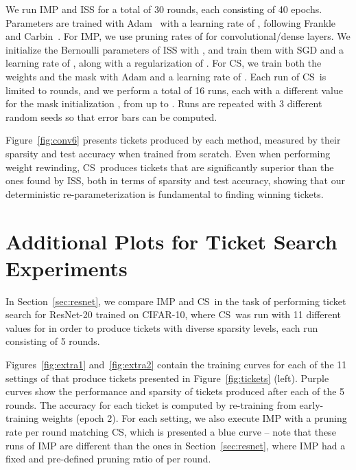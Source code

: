 \documentclass{article}
\newcommand{\citep}[1]{\cite{#1}}
\newcommand{\citet}[1]{\cite{#1}}
\newcommand{\methodacro}{CS}
\begin{document}
We run IMP and ISS for a total of 30 rounds, each consisting of 40 epochs. Parameters are trained with Adam~\citep{adam} with a learning rate of , following Frankle and Carbin~\citet{lth}. For IMP, we use pruning rates of  for convolutional/dense layers. We initialize the Bernoulli parameters of ISS with , and train them with SGD and a learning rate of , along with a  regularization of . For \methodacro, we train both the weights and the mask with Adam and a learning rate of . Each run of \methodacro~is limited to  rounds, and we perform a total of 16 runs, each with a different value for the mask initialization , from  up to . Runs are repeated with 3 different random seeds so that error bars can be computed.

Figure~\ref{fig:conv6} presents tickets produced by each method, measured by their sparsity and test accuracy when trained from scratch. Even when performing weight rewinding, \methodacro~produces tickets that are significantly superior than the ones found by ISS, both in terms of sparsity and test accuracy, showing that our deterministic re-parameterization is fundamental to finding winning tickets.

\section{Additional Plots for Ticket Search Experiments}
\label{app:additional}

In Section~\ref{sec:resnet}, we compare IMP and \methodacro~in the task of performing ticket search for ResNet-20 trained on CIFAR-10, where \methodacro~was run with 11 different values for  in order to produce tickets with diverse sparsity levels, each run consisting of 5 rounds.







Figures~\ref{fig:extra1} and~\ref{fig:extra2} contain the training curves for each of the 11 settings of  that produce tickets presented in Figure~\ref{fig:tickets} (left). Purple curves show the performance and sparsity of tickets produced after each of the 5 rounds. The accuracy for each ticket is computed by re-training from early-training weights (epoch 2). For each setting, we also execute IMP with a pruning rate per round matching \methodacro, which is presented a blue curve -- note that these runs of IMP are different than the ones in Section~\ref{sec:resnet}, where IMP had a fixed and pre-defined pruning ratio of  per round.
\end{document}
